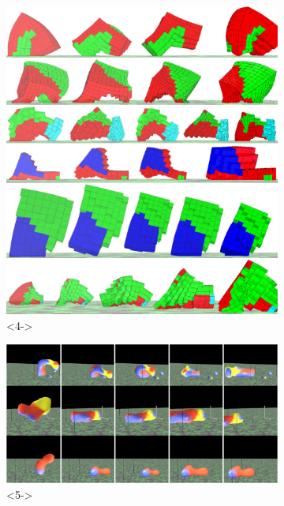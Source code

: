 \documentclass[serif, pdf]{beamer}
\begin{document}
\begin{frame}
\begin{figure}[ht!]
\begin{subfigure}{.23\textwidth}
            \includegraphics[width=1\linewidth]{Cheney.png}<4->%
        \end{subfigure}
        \begin{subfigure}{.5\textwidth}
            \includegraphics[width=1\linewidth]{Hiller.png}<5->%
        \end{subfigure}
    \end{figure}
\end{frame}

\end{document}
